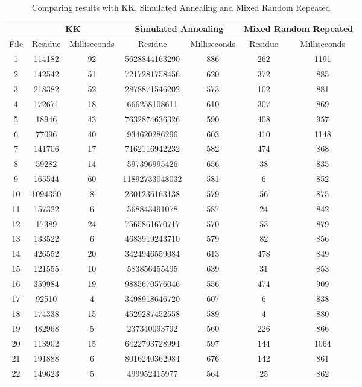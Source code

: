 \documentclass[tikz, 12pt]{scrartcl}
\begin{document}
\begin{longtable}{|c|cc|cc|cc|}
\caption{Comparing results with KK,  Simulated Annealing and Mixed Random Repeated}\\
\hline
 	 & \multicolumn{2}{c}{ KK} 	 & \multicolumn{2}{c}{ Simulated Annealing} 	 & \multicolumn{2}{c|}{ Mixed Random Repeated} \\
\hline
File	 & Residue 	 & 	 Milliseconds	 & Residue 	 & 	 Milliseconds	 & Residue 	 & 	 Milliseconds\\
\hline
1	 &114182	 & 	92	 &5628844163290	 & 	886	 &262	 & 	1191\\
2	 &142542	 & 	51	 &7217281758456	 & 	620	 &372	 & 	885\\
3	 &218382	 & 	52	 &2878871546202	 & 	573	 &102	 & 	881\\
4	 &172671	 & 	18	 &666258108611	 & 	610	 &307	 & 	869\\
5	 &18946	 & 	43	 &7632874636326	 & 	590	 &408	 & 	957\\
6	 &77096	 & 	40	 &934620286296	 & 	603	 &410	 & 	1148\\
7	 &141706	 & 	17	 &7162116942232	 & 	582	 &474	 & 	868\\
8	 &59282	 & 	14	 &597396995426	 & 	656	 &38	 & 	835\\
9	 &165544	 & 	60	 &11892733048032	 & 	581	 &6	 & 	852\\
10	 &1094350	 & 	8	 &2301236163138	 & 	579	 &56	 & 	875\\
11	 &157322	 & 	6	 &568843491078	 & 	587	 &24	 & 	842\\
12	 &17389	 & 	24	 &7565861670717	 & 	570	 &53	 & 	879\\
13	 &133522	 & 	6	 &4683919243710	 & 	579	 &82	 & 	856\\
14	 &426552	 & 	20	 &3424946559084	 & 	613	 &478	 & 	849\\
15	 &121555	 & 	10	 &583856455495	 & 	639	 &31	 & 	853\\
16	 &359984	 & 	19	 &9885670576046	 & 	556	 &474	 & 	909\\
17	 &92510	 & 	4	 &3498918646720	 & 	607	 &6	 & 	838\\
18	 &174338	 & 	15	 &4529287452558	 & 	589	 &4	 & 	880\\
19	 &482968	 & 	5	 &237340093792	 & 	560	 &226	 & 	866\\
20	 &113902	 & 	15	 &6422793728994	 & 	597	 &144	 & 	1064\\
21	 &191888	 & 	6	 &8016240362984	 & 	676	 &142	 & 	861\\
22	 &149623	 & 	5	 &499952415977	 & 	564	 &25	 & 	862\\

\end{longtable}
\end{document}
